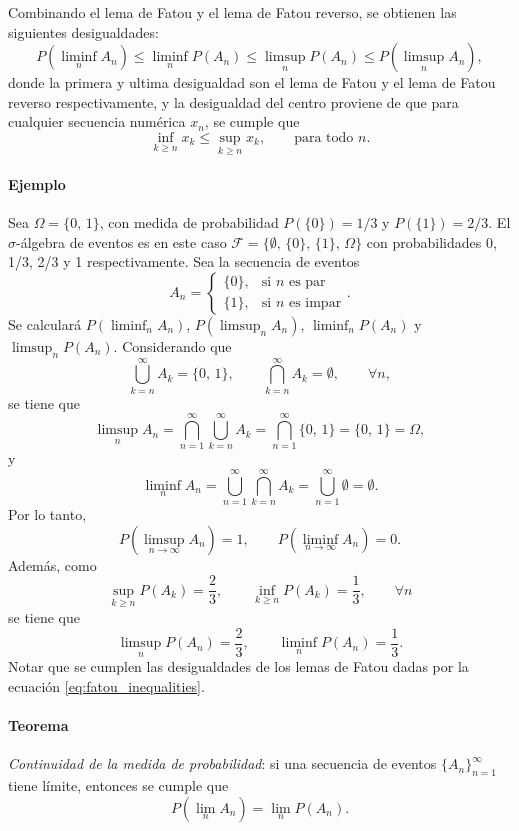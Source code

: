 \documentclass[a4paper]{report}
\begin{document}
Combinando el lema de Fatou y el lema de Fatou reverso, se obtienen las siguientes desigualdades:
\begin{equation}\label{eq:fatou_inequalities}
 P\left(\liminf_n A_n\right)\leq\liminf_n P\left(A_n\right)\leq\limsup_n P\left(A_n\right)\leq P\left(\limsup_n A_n\right),
\end{equation}
donde la primera y ultima desigualdad son el lema de Fatou y el lema de Fatou reverso respectivamente, y la desigualdad del centro proviene de que para cualquier secuencia numérica \(x_n\), se cumple que
\[
 \inf_{k\geq n}x_k\leq\sup_{k\geq n}x_k,\qquad\textrm{para todo }n. 
\]
\paragraph{Ejemplo} Sea \(\Omega=\{0,\,1\}\), con medida de probabilidad \(P(\{0\})=1/3\) y \(P(\{1\})=2/3\). El \(\sigma\)-álgebra de eventos es en este caso \(\mathcal{F}=\{\emptyset,\,\{0\},\,\{1\},\,\Omega\}\) con probabilidades 0, 1/3, 2/3 y 1 respectivamente. Sea la secuencia de eventos
\[
 A_n=
 \left\{\begin{array}{ll}
  \{0\}, & \textrm{si }n\textrm{ es par} \\
  \{1\}, & \textrm{si }n\textrm{ es impar}
 \end{array} \right..
\]
Se calculará \(P(\liminf_n A_n)\), \(P(\limsup_n A_n)\), \(\liminf_n P(A_n)\) y \(\limsup_n P(A_n)\). Considerando que 
\[
 \bigcup_{k=n}^{\infty }A_k=\{0,\,1\},\qquad \bigcap_{k=n}^{\infty}A_k=\emptyset,\qquad \forall n,
\]
se tiene que
\[
 \limsup_n A_n=\bigcap_{n=1}^{\infty}\bigcup_{k=n}^{\infty}A_k=\bigcap_{n=1}^{\infty}\{0,\,1\}=\{0,\,1\}=\Omega,
\]
y
\[
 \liminf_n A_n=\bigcup_{n=1}^{\infty}\bigcap_{k=n}^{\infty}A_k=\bigcup_{n=1}^{\infty}\emptyset=\emptyset.
\]
Por lo tanto,
\[
 P\left(\limsup_{n\rightarrow \infty }A_n\right)=1,\qquad P\left(\liminf_{n\rightarrow \infty }A_n\right)=0.
\]
Además, como
\[
 \sup_{k\geq n}P(A_k)=\frac{2}{3},\qquad \inf_{k\geq n}P(A_k)=\frac{1}{3},\qquad\forall n
\]
se tiene que
\[
 \limsup_n P(A_n)=\frac{2}{3},\qquad \liminf_n P(A_n)=\frac{1}{3}.
\]
Notar que se cumplen las desigualdades de los lemas de Fatou dadas por la ecuación \ref{eq:fatou_inequalities}.

\paragraph{Teorema} \emph{Continuidad de la medida de probabilidad}: si una secuencia de eventos \(\{A_n\}_{n=1}^{\infty}\) tiene límite, entonces se cumple que
\begin{equation}\label{eq:probability_continuity}
  P\left(\lim_n A_n\right) = \lim_n P\left(A_n\right).
\end{equation}
\end{document}
